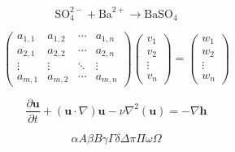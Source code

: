 \documentclass{article}
\begin{document}
    \[ 
        \text{SO}_4^{2-} + \text{Ba}^{2+}
        \to
        \text{BaSO}_4 
    \]
    
    \[   
        \begin{pmatrix}
            a_{1,1} & a_{1,2} & \cdots & a_{1,n} \\ 
            a_{2,1} & a_{2,2} & \cdots & a_{2,n} \\ 
             \vdots & \vdots & \ddots & \vdots \\ 
            a_{m,1} & a_{m,2} & \cdots & a_{m,n}
        \end{pmatrix}
        \begin{pmatrix}
            v_1 \\
            v_2 \\
            \vdots \\
            v_n
        \end{pmatrix}
        =
        \begin{pmatrix}
            w_1 \\
            w_2 \\
            \vdots \\
            w_n
        \end{pmatrix} 
    \]
    
    \[ 
        \frac{\partial \textbf{u}}{\partial t} + 
        \left(\textbf{u}\cdot\nabla\right)\textbf{u} - 
        \nu\nabla^2\left(\textbf{u}\right) = 
        -\nabla \textbf{h} 
    \] 
    
    \[ 
        \alpha A\beta B\gamma\Gamma\delta\Delta\pi\Pi\omega\Omega 
    \]
    
\end{document}
